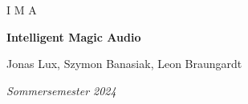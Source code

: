 \documentclass{article}
\begin{document}
\begin{titlepage}
\centering

	{\Large I M A \par}
	{\huge\bfseries Intelligent Magic Audio\par}
	{Jonas Lux, Szymon Banasiak, Leon Braungardt\par}
	\vspace{2cm}
	{\Large\itshape Sommersemester 2024 \par}
	\vfill
	
  
\end{titlepage}


\tableofcontents
\listoffigures
\newpage













\appendix

\newpage
\end{document}
